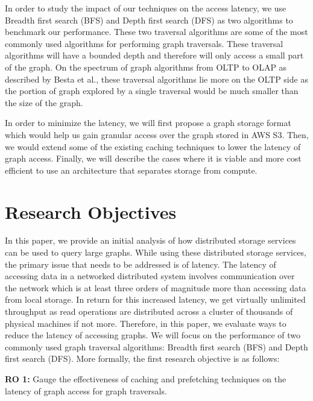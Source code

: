 \medskip
In order to study the impact of our techniques on the access latency, we use
Breadth first search (BFS) and Depth first search (DFS) as two algorithms to
benchmark our performance. These two traversal algorithms are some of the most
commonly used algorithms for performing graph traversals\cite{sahu2017ubiquity}.
These traversal algorithms will have a bounded depth and therefore will only
access a small part of the graph. On the spectrum of graph algorithms from OLTP
to OLAP as described by Besta et al.\cite{besta2023demystifying}, these 
traversal algorithms lie
more on the OLTP side as the portion of graph explored by a single traversal
would be much smaller than the size of the graph.

\medskip
In order to minimize the latency, we will first propose a graph storage format which
would help us gain granular access over the graph stored in AWS S3. Then, we
would extend some of the existing caching techniques to lower the latency of
graph access. Finally, we will describe the cases where it is viable and more
cost efficient to use an architecture that separates storage from compute.

\section{Research Objectives}
In this paper, we provide an initial analysis of how distributed storage services can 
be used to query large graphs. While using these distributed storage services, the primary
issue that needs to be addressed is of latency. The latency of accessing data in a networked
distributed system involves communication over the network which is at least three orders of
magnitude more than accessing data from local storage. In return for this increased latency,
we get virtually unlimited throughput as read operations are distributed across a cluster 
of thousands of physical machines if not more. Therefore, in this paper, we evaluate ways to
reduce the latency of accessing graphs. We will focus on the 
performance of two commonly used graph traversal algorithms: Breadth first search 
(BFS) and Depth first search (DFS). More formally, the first research
objective is as follows:
\begin{displayquote}
    \textbf{RO 1:} Gauge the effectiveness of caching and prefetching techniques
    on the latency of graph access for graph traversals.
\end{displayquote}

